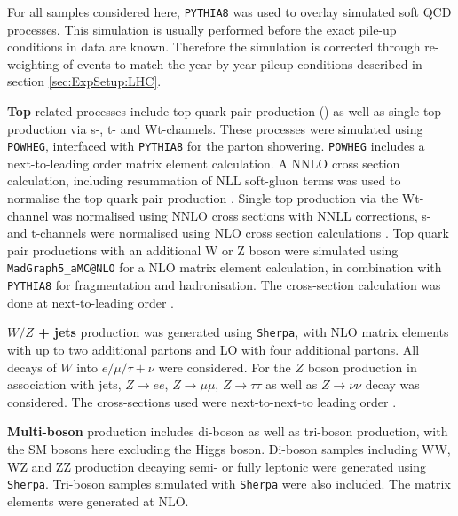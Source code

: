 For all samples considered here,  \texttt{PYTHIA8} was used to overlay simulated soft QCD processes.  This simulation is usually performed before the exact pile-up conditions in data are known.  Therefore the simulation is corrected through re-weighting of events to match the year-by-year pileup conditions described in section \ref{sec:ExpSetup:LHC}. 

\textbf{Top} related processes include top quark pair production (\ttbar) as well as single-top production via s-, t- and Wt-channels. These processes were simulated using  \texttt{POWHEG},  interfaced with \texttt{PYTHIA8} for the parton showering.  \texttt{POWHEG} includes a next-to-leading order matrix element calculation.  A \ac{NNLO} cross section calculation, including resummation of \ac{NLL} soft-gluon terms was used to normalise the top quark pair production \cite{Beneke_2012,Cacciari_2012,B_rnreuther_2012,Czakon_2012,Czakon_2013,Czakon_2013_2,Czakon_2014}.
Single top production via the Wt-channel was normalised using \ac{NNLO} cross sections with \ac{NNLL} corrections,  s- and t-channels were normalised using NLO cross section calculations \cite{Kant_2015, Aliev_2011}. 
Top quark pair productions with an additional W or Z boson were simulated using \texttt{MadGraph5\_aMC@NLO} for a \ac{NLO} matrix element calculation,  in combination with \texttt{PYTHIA8} for fragmentation and hadronisation. The cross-section calculation was done at next-to-leading order \cite{Lazopoulos_2008,Campbell_2012}.

\textbf{$W/Z$ + jets} production was generated using \texttt{Sherpa}, with \ac{NLO} matrix elements with up to two additional partons and \ac{LO} with four additional partons.  All decays of $W$ into $e/\mu/\tau + \nu$ were considered.  For the $Z$ boson production in association with jets,  $Z\rightarrow ee$,   $Z\rightarrow \mu\mu$,   $Z\rightarrow \tau\tau$ as well as $Z\rightarrow \nu\nu$ decay was considered. The cross-sections used were next-to-next-to leading order \cite{Catani_2009}.

\textbf{Multi-boson} production includes di-boson as well as tri-boson production,  with the \ac{SM} bosons here excluding the Higgs boson.  Di-boson samples including WW, WZ and ZZ production decaying semi- or fully leptonic were generated using \texttt{Sherpa}.  Tri-boson samples simulated with \texttt{Sherpa} were also included.  The matrix elements were generated at \ac{NLO}.

